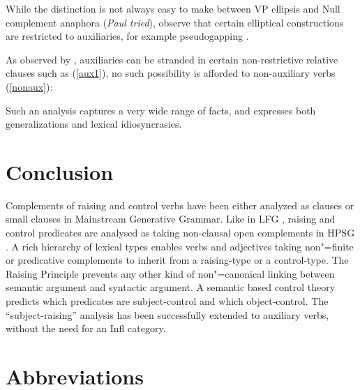 \documentclass[output=paper
                ,modfonts
                ,nonflat
	        ,collection
	        ,collectionchapter
	        ,collectiontoclongg
 	        ,biblatex
                ,babelshorthands
                ,newtxmath
                ,draftmode
                ,colorlinks, citecolor=brown
]{./langsci/langscibook}
\begin{document}
\eal
{}
\zl

While the distinction is not always easy to make between VP ellipsis and Null complement anaphora (\textit{Paul tried}), \citeauthor{Sagetal2020} observe that certain elliptical constructions are restricted to auxiliaries, for example pseudogapping \citep{Miller2014a}.

\eal
{}
\zl

As observed by \citet{ArnoldandBorsley2008}, auxiliaries can be stranded in certain non-restrictive relative clauses such as (\ref{aux1}), no such possibility is afforded to non-auxiliary verbs (\ref{nonaux}):

\eal
{}
\zl

Such an analysis captures a very wide range of facts, and expresses both generalizations and lexical idiosyncrasies.


	
\section{Conclusion}
Complements of raising and control verbs have been either analyzed as clauses \citep{Chomsky1981} or small clauses \citep{Stowell1981,Stowell1983} in Mainstream Generative Grammar.
Like in LFG \citep{Bresnan1982}, raising and control predicates are analysed as taking non-clausal open complements in HPSG \citep{PollardandSag1994}. A rich hierarchy of lexical types enables verbs and adjectives taking non"=finite or predicative complements to inherit from a raising-type or a control-type. The Raising Principle prevents any other kind of non"=canonical linking between semantic argument and syntactic argument. A semantic based control theory predicts which predicates are subject-control and which object-control. The ``subject-raising'' analysis has been successfully extended to auxiliary verbs, without the need for an Infl category.




\section*{Abbreviations}
\end{document}
